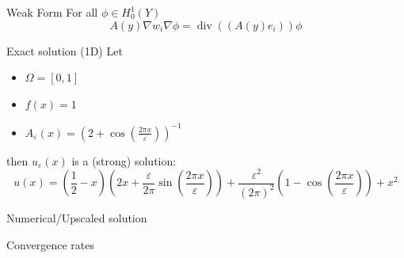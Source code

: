 \documentclass{beamer}
\renewcommand{\epsilon}{\varepsilon}
\renewcommand{\div}[1]{\operatorname{div}\left( #1 \right)}
\begin{document}
\begin{frame}[t]{Weak Form}
    For all $\phi \in H^1_0(Y)$
    \begin{equation}
        A(y)\nabla w_i \nabla \phi = \div{(A(y)e_i)}\phi
        \label{eq:weak_cell_problem}
    \end{equation}
\end{frame}

\begin{frame}[t]{Exact solution (1D)}
    Let \begin{itemize}
        \item $\Omega = [0,1]$
        \item $f(x) = 1$
        \item $A_\varepsilon(x) = \left( 2+\cos\left(\frac{2\pi x}{\epsilon}\right) \right)^{-1}$
    \end{itemize}
    then $u_\varepsilon(x)$ is a (strong) solution:
    \[ u(x) = \left( \frac{1}{2} - x \right) \left(2x + \frac{\epsilon}{2\pi}\sin\left(\frac{2\pi x}{\epsilon}\right) \right) + \frac{\epsilon^2}{(2\pi)^2}\left( 1 - \cos \left( \frac{2\pi x}{\epsilon} \right) \right) + x^2 \]
\end{frame}

\begin{frame}[t]{Numerical/Upscaled solution}

\end{frame}

\begin{frame}[t]{Convergence rates}

\end{frame}
\end{document}
